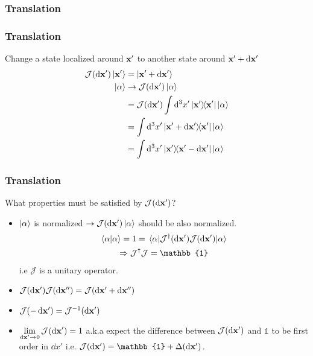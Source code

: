 \subsubsection{Translation}
\begin{frame}
	\frametitle{Translation}

	Change a state localized around $\vb{x'}$ to another state around $\vb{x'} + \dd{\vb{x'}}$
	\\
	\begin{align*}
		\mathcal{J}(\dd{\vb x'}) \ket{\vb x'} & = \ket{\vb x' + \dd{\vb x'}}                                       \\
		\ket{\alpha}                          & \to \mathcal{J}(\dd{\vb x'})\ket{\alpha}                           \\
		                                      & = \mathcal{J}(\dd{\vb x'}) \int \dd[3]{x'} \op{\vb x'}\ket{\alpha} \\
		                                      & = \int \dd[3]{x'} \op{\vb x' + \dd{\vb x'}}{\vb x'} \ket \alpha    \\
		                                      & = \int \dd[3]{x'} \op{\vb x'}{\vb x' - \dd{\vb x'}} \ket \alpha
	\end{align*}


\end{frame}

\begin{frame}
	\frametitle{Translation}
	What properties must be satisfied by $\mathcal{J}(\dd{\vb x'})$?
	\begin{itemize}
		\item $\ket{\alpha}$ is normalized $\to \mathcal{J}(\dd{\vb x'}) \ket \alpha$ should be also normalized.
		      \begin{gather*}
			      \ip{\alpha} = 1 = \ev{\mathcal{J}^\dag (\dd{\vb x'}) \mathcal{J}(\dd{\vb x'})}{\alpha}\\
			      \Rightarrow \mathcal{J}^\dag \mathcal J= \mathbb{1}
		      \end{gather*}
		      i.e $\mathcal{J}$ is a unitary operator.

		\item $\mathcal{J}(\dd{\vb x'})\mathcal{J}(\dd{\vb x''}) = \mathcal{J}(\dd{\vb x'} + \dd{\vb x''})$
		\item $ \mathcal{J}(-\dd{\vb x'}) = \mathcal{J}^{-1}(\dd{\vb x'})$
		\item $ \displaystyle \lim_{\dd{\vb x'} \to 0} \mathcal{J}(\dd{\vb x'}) = 1$ a.k.a expect the difference between $\mathcal{J}(\dd{\vb x'})$ and $\mathbb 1$ to be first order in $\dd{x'}$ i.e. $\mathcal{J}(\dd{\vb x'}) = \mathbb{1} + \Delta(\dd{\vb x'})$.
	\end{itemize}

\end{frame}

